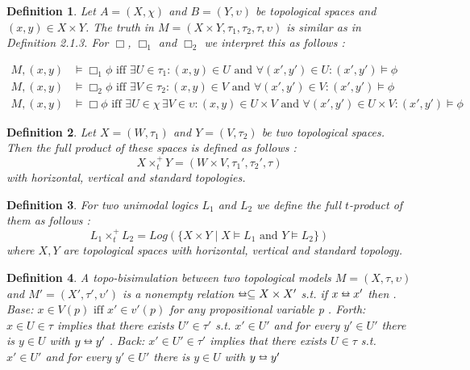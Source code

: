 \documentclass[12pt, a4paper]{scrartcl}
\newtheorem{definition}{Definition}[subsection]
\begin{document}
\begin{definition}
    Let $A = (X, \chi)$ and $B =(Y, \upsilon)$ be topological spaces and $(x,y) \in X \times Y$. The truth in $M = (X\times Y, \tau_1,\tau_2,\tau, \upsilon)$ is similar as in Definition 2.1.3.
    For $\Box$, $\Box_1$ and $\Box_2$ we interpret this as follows : 
    
    \begin{align*}
        M,(x,y) &\vDash \Box_1 \phi \mbox{ iff } \exists U \in \tau_1 : (x,y) \in U \mbox{ and } \forall(x',y') \in U : (x',y') \vDash \phi \\
        M,(x,y) &\vDash \Box_2 \phi \mbox{ iff } \exists V \in \tau_2 : (x,y) \in V \mbox{ and } \forall(x',y') \in V : (x',y') \vDash \phi \\
        M,(x,y) &\vDash \Box \phi \mbox{ iff } \exists U \in \chi \, \exists V \in \upsilon: (x,y) \in U \times V \mbox{ and } \forall(x',y') \in U \times V : (x',y') \vDash \phi
    \end{align*}

\end{definition}

\begin{definition}
    Let $X = (W, \tau_1)$ and $Y = (V, \tau_2)$ be two topological spaces. Then the full product of these spaces is defined as follows :
    $$X \times^+_t Y = (W \times V, \tau_1', \tau_2', \tau)$$
    with horizontal, vertical and standard topologies.
\end{definition}

\begin{definition}
    For two unimodal logics $L_1$ and $L_2$ we define the full $t$-product of them as follows :
    $$L_1 \times^+_t L_2 = Log(\{X \times Y \mid X \vDash L_1 \mbox{ and } Y \vDash L_2\})$$
    where $X,Y$ are topological spaces with horizontal, vertical and standard topology.
\end{definition}

\begin{definition}
    A topo-bisimulation between two topological models $M = (X,\tau, \upsilon)$ and $M' = (X', \tau', \upsilon')$ is a nonempty relation $\leftrightarroweq \subseteq X \times X'$ s.t. if $x \leftrightarroweq x'$ then \newline 
    . Base: $x \in V(p) \mbox{ iff } x' \in v'(p)$ for any propositional variable p . Forth: $x \in U \in \tau$ implies that there exists $U' \in \tau'$ s.t. $x' \in U'$ and for every $y' \in U'$ there is $y \in U$ with $y \leftrightarroweq y'$ . Back: $x' \in U' \in \tau'$ implies that there exists $U \in \tau$ s.t. $x' \in U'$ and for every $y' \in U'$ there is $y \in U$ with $y \leftrightarroweq y'$

\end{definition}
\end{document}
